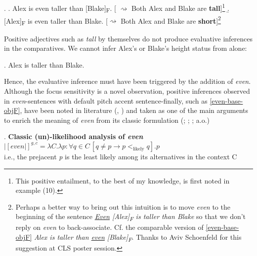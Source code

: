 \documentclass[12pt,letterpaper]{scrartcl}
\newcommand{\alignright}{\hspace*{\fill}}
\newcommand{\infer}{$\rightsquigarrow$ }
\newcommand{\sub}[1]{\textsubscript{#1}}
\begin{document}
\ex.\label{even-base} \a. Alex is even taller than [Blake]\textsubscript{F}.  %
\alignright [ \infer Both Alex and Blake are \textbf{tall}]\footnote{This positive entailment, to the best of my knowledge, is first noted in \cite{greenberg_even_2015} example (10).} \label{even-base-objF}
\b. [Alex]\textsubscript{F} is even taller than Blake. %
\alignright [\infer Both Alex and Blake are \textbf{short}]\footnote{Perhaps a better way to bring out this intuition is to move \textit{even} to the beginning of the sentence \textit{\underline{Even} [Alex]\sub{F} is taller than Blake} so that we don't reply on \textit{even} to back-associate. Cf. the comparable version of \ref{even-base-objF} \textit{Alex is taller than \underline{even} [Blake]\sub{F}}. Thanks to Aviv Schoenfeld for this suggestion at CLS poster session.} \label{even-base-subF}

Positive adjectives such as \textit{tall} by themselves do not produce evaluative inferences in the comparatives. We cannot infer Alex's or Blake's height status from \Next alone:

\ex. Alex is taller than Blake.

Hence, the evaluative inference must have been triggered by the addition of \textit{even}. Although the focus sensitivity is a novel observation, positive inferences observed in \textit{even}-sentences with default pitch accent sentence-finally, such as \ref{even-base-objF},  have been noted in literature (\cite{greenberg_even_2015}, \cite{daniels_even_2020}) and taken as one of the main arguments to enrich the meaning of \textit{even} from its classic formulation (\cite{karttunen_conventional_1979}; \cite{rooth_theory_1992}; \cite{chierchia_logic_2013}; a.o.)

\ex.\label{classicunlikelihood} \textbf{Classic (un)-likelihood analysis of \textit{even}} \\
    $|[\textit{even}|]^{g, c} = \lambda C. \lambda p : \forall q \in C \, [q \neq p \rightarrow p <_{\text{likely}} q]. p$ \\
    i.e., the prejacent \textit{p} is the least likely among its alternatives in the context C
    
\end{document}
